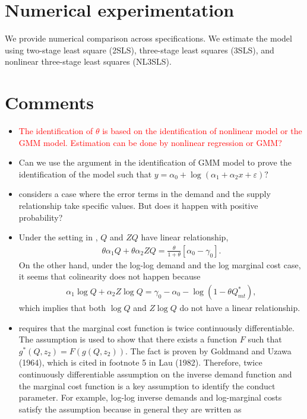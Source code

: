 \documentclass[11pt]{article}
\begin{document}
\section{Numerical experimentation}
We provide numerical comparison across specifications. We estimate the model using two-stage least square (2SLS), three-stage least
squares (3SLS), and nonlinear three-stage least squares (NL3SLS).
    



\section{Comments}
    \begin{itemize}
        \item \textcolor{red}{ The identification of $\theta$ is based on the identification of nonlinear model or the GMM model. Estimation can be done by nonlinear regression or GMM?}
        \item Can we use the argument in the identification of GMM model to prove the identification of the model such that  $y = \alpha_0 + \log(\alpha_1 + \alpha_2 x +\varepsilon)?$
        \item \cite{perloff2012collinearity} considers a case where the error terms in the demand and the supply relationship take specific values. But does it happen with positive probability?  
        \item Under the setting in \cite{perloff2012collinearity}, $Q$ and $ZQ$ have linear relationship, 
        \begin{align*}
            \theta \alpha_1 Q + \theta \alpha_2 ZQ = \frac{\theta}{1 + \theta} [\alpha_0 - \gamma_0].
        \end{align*}
        On the other hand, under the log-log demand and the log marginal cost case, it seems that colinearity does not happen because 
        \begin{align*}
            \alpha_1 \log Q + \alpha_2 Z\log Q = \gamma_0 - \alpha_0 -  \log \left(  1 - \theta Q^*_{mt} \right),
        \end{align*}
        which implies that both $\log Q$ and $Z\log Q$ do not have a linear relationship.
        \item \cite{lau1982identifying} requires that the marginal cost function is twice continuously differentiable. The assumption is used to show that there exists a function $F$ such that $g^*(Q,z_2) = F(g(Q,z_2))$. The fact is proven by Goldmand and Uzawa (1964), which is cited in footnote 5 in Lau (1982). Therefore, twice continuously differentiable assumption on the inverse demand function and the marginal cost function is a key assumption to identify the conduct parameter. For example, log-log inverse demands and log-marginal costs satisfy the assumption because in general they are written as 

\end{itemize}
\end{document}
